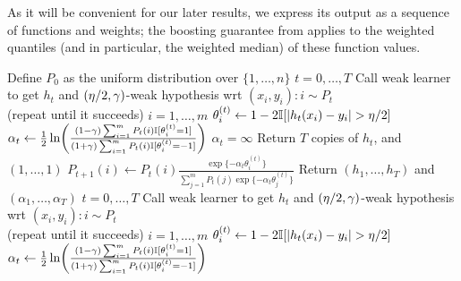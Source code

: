 As it will be convenient for our later results, we express
its output as a sequence
of functions and weights; 
the boosting guarantee from \citet{kegl2003robust} applies to the weighted quantiles (and in particular, the weighted median) of these function values.

\begin{algorithm}
\label{alg:medboost}
\caption{($\{(x_i,y_i)\}_{i\in[m]}$,$T$,$\adv$,$\dev$)}
\begin{algorithmic}
\State Define $P_{0}$ as the uniform distribution over $\{1,\ldots,n\}$
\For $t=0,\ldots,T$
    \State Call weak learner to get $h_{t}$ and $(\eta/2,\gamma)$-weak hypothesis wrt $(x_{i},y_{i})\! :\! i \!\sim\! P_{t}$\\ (repeat until it succeeds)
    \For $i = 1,\ldots,m$
      \State $\theta_{i}^{(t)} \gets 1 - 2 \mathbb{I}[ |h_{t}(x_{i}) - y_{i}| > \eta/2 ]$
    \EndFor
    \State $\alpha_{t} \gets \frac{1}{2} \ln\!\left( \frac{ (1-\gamma) \sum_{i=1}^{m} P_{t}(i) \mathbb{I}[ \theta_{i}^{(t)} = 1 ] }{ (1+\gamma) \sum_{i=1}^{m} P_{t}(i) \mathbb{I}[ \theta_{i}^{(t)} = -1 ] } \right)$
    \If $\alpha_{t} = \infty$ %
      \State Return $T$ copies of $h_{t}$, and $(1,\ldots,1)$
    \EndIf
      \State $P_{t+1}(i) \gets P_{t}(i) \frac{\exp\{-\alpha_{t}\theta_{i}^{(t)}\}}{\sum_{j=1}^{m} P_{t}(j) \exp\{-\alpha_{t}\theta_{j}^{(t)}\}}$
    \EndFor
\EndFor
\State Return $(h_{1},\ldots,h_{T})$ and $(\alpha_{1},\ldots,\alpha_{T})$ %
\For $t=0,\ldots,T$
    \State Call weak learner to get $h_{t}$ and $(\eta/2,\gamma)$-weak hypothesis wrt $(x_{i},y_{i})\! :\! i \!\sim\! P_{t}$\\ (repeat until it succeeds)
    \For $i = 1,\ldots,m$
      \State $\theta_{i}^{(t)} \gets 1 - 2 \mathbb{I}[ |h_{t}(x_{i}) - y_{i}| > \eta/2 ]$
    \EndFor
    \State $\alpha_{t} \gets \frac{1}{2} \ln\!\left( \frac{ (1-\gamma) \sum_{i=1}^{m} P_{t}(i) \mathbb{I}[ \theta_{i}^{(t)} = 1 ] }{ (1+\gamma) \sum_{i=1}^{m} P_{t}(i) \mathbb{I}[ \theta_{i}^{(t)} = -1 ] } \right)$

\end{algorithmic}
\end{algorithm}
